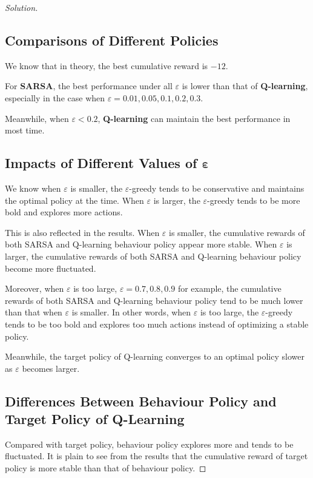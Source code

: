 \documentclass{article}
\newenvironment{solution}{\begin{proof}[\noindent\it Solution]}{\end{proof}}
\newcommand{\bd}[1]{\boldsymbol{#1}}
\begin{document}
\begin{solution}
    \subsection{Comparisons of Different Policies}

    \hspace{1.9em}
    We know that in theory, the best cumulative reward is $-12$.

    \hspace{0.5em}
    For \textbf{SARSA}, the best performance under all $\varepsilon$ is lower than that of \textbf{Q-learning}, especially in the case when $\varepsilon=0.01, 0.05, 0.1, 0.2, 0.3$.

    \hspace{0.5em}
    Meanwhile, when $\varepsilon<0.2$, \textbf{Q-learning} can maintain the best performance in most time.

    \subsection{Impacts of Different Values of $\bd{\varepsilon}$}

    \hspace{1.9em}
    We know when $\varepsilon$ is smaller, the $\varepsilon$-greedy tends to be conservative and maintains the optimal policy at the time. When $\varepsilon$ is larger, the $\varepsilon$-greedy tends to be more bold and explores more actions.

    \hspace{0.5em}
    This is also reflected in the results. When $\varepsilon$ is smaller, the cumulative rewards of both SARSA and Q-learning behaviour policy appear more stable. When $\varepsilon$ is larger, the cumulative rewards of both SARSA and Q-learning behaviour policy become more fluctuated.

    \hspace{0.5em}
    Moreover, when $\varepsilon$ is too large, $\varepsilon=0.7, 0.8, 0.9$ for example, the cumulative rewards of both SARSA and Q-learning behaviour policy tend to be much lower than that when $\varepsilon$ is smaller. In other words, when $\varepsilon$ is too large, the $\varepsilon$-greedy tends to be too bold and explores too much actions instead of optimizing a stable policy.

    \hspace{0.5em}
    Meanwhile, the target policy of Q-learning converges to an optimal policy slower as $\varepsilon$ becomes larger.

    \vspace{1em}
    \subsection{Differences Between Behaviour Policy and Target Policy of Q-Learning}

    \hspace{1.9em}
    Compared with target policy, behaviour policy explores more and tends to be fluctuated. It is plain to see from the results that the cumulative reward of target policy is more stable than that of behaviour policy.

\end{solution}
\end{document}
